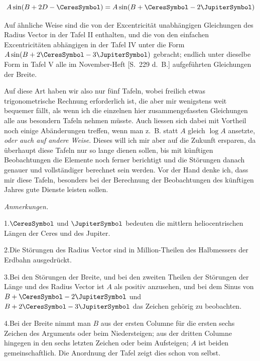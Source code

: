 \[
A\sin(B+2D-\CeresSymbol)=A\sin(B+\CeresSymbol-2\JupiterSymbol)
\]

Auf ähnliche Weise sind die von der Excentricität unabhängigen Gleichungen des Radius Vector in der Tafel II enthalten, und die von den einfachen Excentricitäten abhängigen in der Tafel IV unter die Form $A\sin(B+2\CeresSymbol-3\JupiterSymbol)$ gebracht; endlich unter dieselbe Form in Tafel V alle im November-Heft [S.\ 229 d.\ B.] aufgeführten Gleichungen der Breite.

Auf diese Art haben wir also nur fünf Tafeln, wobei freilich etwas trigonometrische Rechnung erforderlich ist, die aber mir wenigstens weit bequemer fällt, als wenn ich die einzelnen hier zusammengefassten Gleichungen alle aus besondern Tafeln nehmen müsste. Auch liessen sich dabei mit Vortheil noch einige Abänderungen treffen, wenn man z.\ B. statt $A$ gleich $\log A$ ansetzte, \textit{oder auch auf andere Weise}. Dieses will ich mir aber auf die Zukunft ersparen, da überhaupt diese Tafeln nur so lange dienen sollen, bis mit künftigen Beobachtungen die Elemente noch ferner berichtigt und die Störungen danach genauer und vollständiger berechnet sein werden. Vor der Hand denke ich, dass mir diese Tafeln, besonders bei der Berechnung der Beobachtungen des künftigen Jahres gute Dienste leisten sollen.

\begin{center}\textit{Anmerkungen.}\end{center}
1.\quad $\CeresSymbol$ und $\JupiterSymbol$ bedeuten die mittlern heliocentrischen Längen der Ceres und des Jupiter.

2.\quad Die Störungen des Radius Vector sind in Million-Theilen des Halb\-messers der Erdbahn ausgedrückt.

3.\quad Bei den Störungen der Breite, und bei den zweiten Theilen der Störungen der Länge und des Radius Vector ist $A$ als positiv anzusehen, und bei dem Sinus von $B+\CeresSymbol-2\JupiterSymbol$ und $B+2\CeresSymbol-3\JupiterSymbol$ das Zeichen gehörig zu beobachten.

4.\quad Bei der Breite nimmt man $B$ aus der ersten Columne für die ersten sechs Zeichen des Arguments oder beim Niedersteigen; aus der dritten Columne hingegen in den sechs letzten Zeichen oder beim Aufsteigen; $A$ ist beiden gemeinschaftlich. Die Anordnung der Tafel zeigt dies schon von selbst.
